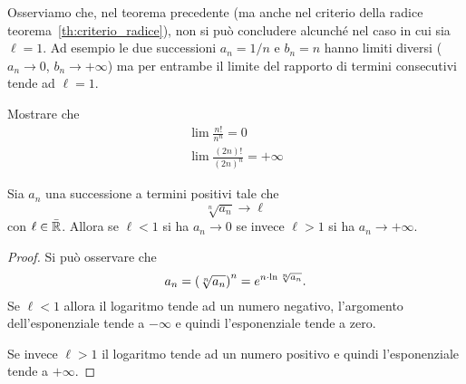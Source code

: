 Osserviamo che, nel teorema precedente (ma anche nel criterio della radice teorema~\ref{th:criterio_radice}),
non si può concludere alcunché nel
caso in cui sia $\ell = 1$.
Ad esempio le due successioni $a_n = 1/n$ e $b_n = n$
hanno limiti diversi ($a_n \to 0$, $b_n\to +\infty$) ma per entrambe
il limite del rapporto di termini consecutivi tende ad $\ell=1$.

\begin{exercise}
Mostrare che
\begin{gather*}
  \lim \frac{n!}{n^n} = 0 \\
  \lim \frac{(2n)!}{(2n)^n} = +\infty
\end{gather*}
\end{exercise}

\begin{theorem}
\label{th:criterio_radice}%
\mymark{***}%
%
%
Sia $a_n$ una successione a termini positivi tale che
\[
  \sqrt[n]{a_n} \to \ell
\]
con $\ell \in \bar {{\mathbb R}}$.
Allora se $\ell<1$ si ha $a_n \to 0$ se invece $\ell > 1$ si ha $a_n \to +\infty$.
\end{theorem}
%
\begin{comment}
\begin{proof}
\mymark{**}
Consideriamo prima il caso $\ell < 1$.
Se $\lim \sqrt[n]{a_n} = \ell$ significa che per ogni $\eps>0$ la successione
$\sqrt[n]{a_n}$ risulta definitivamente minore di $\ell +\eps$.
Scegliendo opportunamente $\eps$ (ad esempio $\eps = (1-\ell)/2$) si potrà
avere $q = \ell+\eps < 1$. Dunque avremo definitivamente $\sqrt[n]{a_n}< q$
ovvero $a_n < q^n$. Per ipotesi $a_n\ge 0$
e quindi, tolto un numero finito di termini, si ottiene $0 \le a_n < q^n \to 0$
da cui $a_n \to 0$ (in quanto l'aver tolto un numero finito di termini non
cambia né il carattere né il limite della successione).

Se $\ell>1$ si potrà procedere in maniera analoga. Esisterà $q$ con $1 < q < \ell$ tale che definitivamente $\sqrt[n]{a_n} > q$ da cui $a_n > q^n \to +\infty$.
\end{proof}
\end{comment}

\begin{proof}
  Si può osservare che
  \[
    a_n = {\left( \sqrt[n]{a_n} \right)}^n
     = e^{n \cdot \ln \sqrt[n]{a_n}}.
  \]
  Se $\ell <1$ allora il logaritmo tende ad un numero negativo,
  l'argomento dell'esponenziale tende a $-\infty$ e quindi l'esponenziale tende a zero.

  Se invece $\ell>1$ il logaritmo tende ad un numero positivo e quindi l'esponenziale tende a $+\infty$.
\end{proof}

